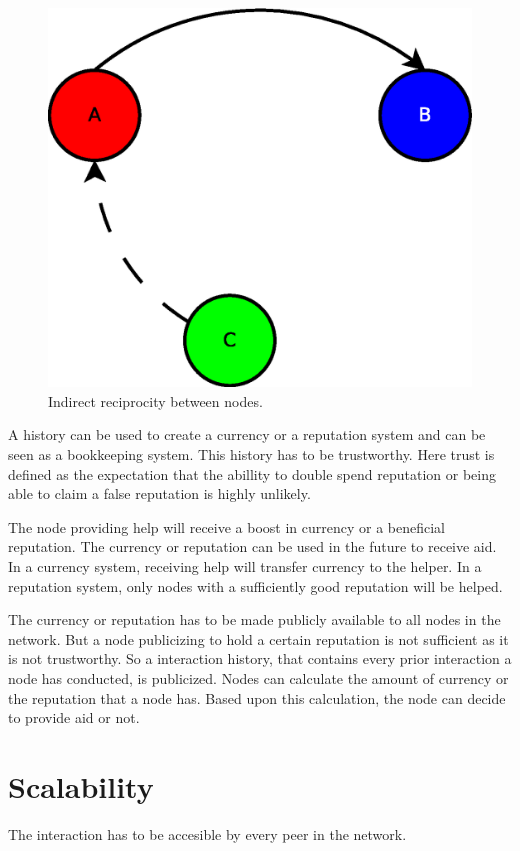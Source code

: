 \begin{figure}
	\centerline{\includegraphics[scale=0.3]{problemDescription/figs/indirect-reciprocity.eps}}
	\caption{Indirect reciprocity between nodes.}
	\label{fig:indirect-reciprocity}
\end{figure}

A history can be used to create a currency or a reputation system
and can be seen as a bookkeeping system.
This history has to be trustworthy.
Here trust is defined as the expectation that the abillity to double spend reputation
or being able to claim a false reputation is highly unlikely.

The node providing help will receive a boost in currency or a beneficial reputation.
The currency or reputation can be used in the future to receive aid.
In a currency system, receiving help will transfer currency to the helper.
In a reputation system, only nodes with a sufficiently good reputation will be helped.

The currency or reputation has to be made publicly available to all nodes in the network.
But a node publicizing to hold a certain reputation is not sufficient as it is not trustworthy.
So a interaction history, that contains every prior interaction a node has conducted, is publicized.
Nodes can calculate the amount of currency or the reputation that a node has.
Based upon this calculation, the node can decide to provide aid or not.

\section{Scalability}
The interaction has to be accesible by every peer in the network.

